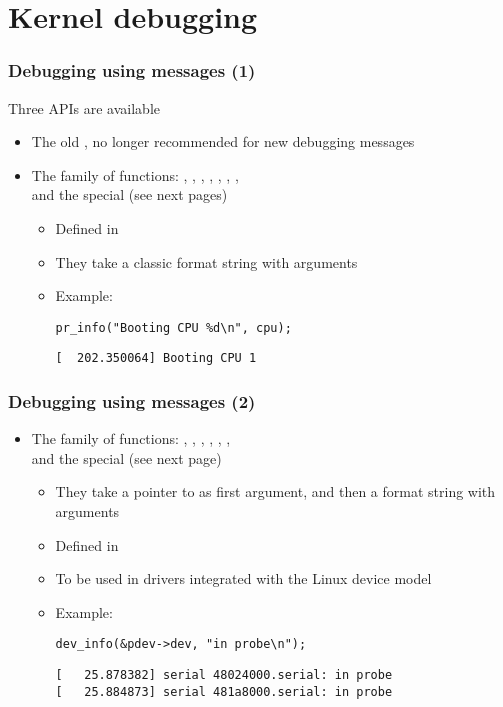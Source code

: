 \section{Kernel debugging}

\begin{frame}[fragile]
  \frametitle{Debugging using messages (1)}
  Three APIs are available
  \begin{itemize}
  \item The old , no longer recommended for new debugging
    messages
  \item The  family of functions: ,
    , , ,
    , , ,
     \\
    and the special  (see next pages)
    \begin{itemize}
    \item Defined in 
    \item They take a classic format string with arguments
    \item Example:
      \begin{verbatim}
pr_info("Booting CPU %d\n", cpu);
      \end{verbatim}
      \begin{verbatim}
[  202.350064] Booting CPU 1
      \end{verbatim}
    \end{itemize}
  \end{itemize}
\end{frame}


\begin{frame}[fragile]
  \frametitle{Debugging using messages (2)}
  \begin{itemize}
  \item The  family of functions: ,
    , , ,
    , ,  \\
    and the special  (see next page)
    \begin{itemize}
    \item They take a pointer to  as first
      argument, and then a format string with arguments
    \item Defined in 
    \item To be used in drivers integrated with the Linux device
      model
    \item Example:
      \begin{verbatim}
dev_info(&pdev->dev, "in probe\n");
      \end{verbatim}
      \begin{verbatim}
[   25.878382] serial 48024000.serial: in probe
[   25.884873] serial 481a8000.serial: in probe
      \end{verbatim}
    \end{itemize}
  \end{itemize}
\end{frame}

